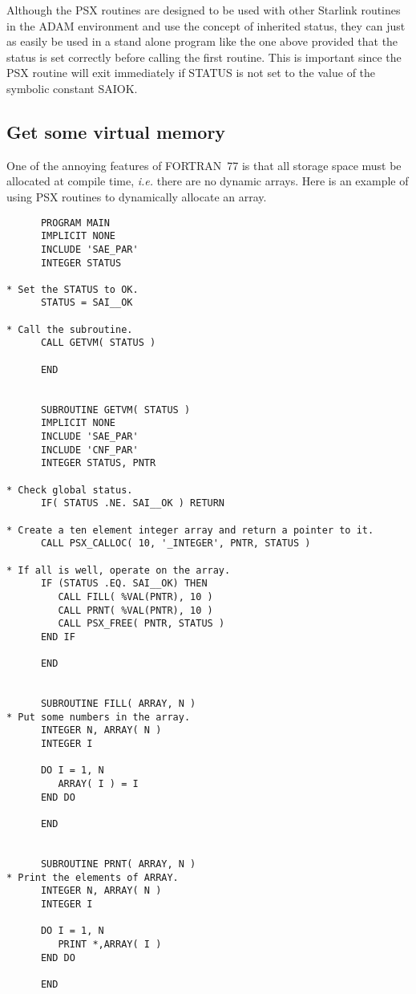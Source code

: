 \documentclass[twoside,11pt]{article}
\newcommand{\xlabel}[1]{}
\renewcommand{\_}{\texttt{\symbol{95}}}
\begin{document}
Although the PSX routines are designed to be used with other Starlink routines
in the ADAM environment and use the concept of inherited status, they can just
as easily be used in a stand alone program like the one above provided that the
status is set correctly before calling the first routine. This is important
since the PSX routine will exit immediately if STATUS is not set to the value
of the symbolic constant SAI\_\_OK.

\subsection{\xlabel{get_some_virtual_memory}Get some virtual memory}

One of the annoying features of FORTRAN~77 is that all storage space must be
allocated at compile time, \emph{i.e.} there are no dynamic arrays. Here is an
example of using PSX routines to dynamically allocate an array.

\begin{small}
\begin{verbatim}
      PROGRAM MAIN
      IMPLICIT NONE
      INCLUDE 'SAE_PAR'
      INTEGER STATUS

* Set the STATUS to OK.
      STATUS = SAI__OK

* Call the subroutine.
      CALL GETVM( STATUS )

      END


      SUBROUTINE GETVM( STATUS )
      IMPLICIT NONE
      INCLUDE 'SAE_PAR'
      INCLUDE 'CNF_PAR'
      INTEGER STATUS, PNTR

* Check global status.
      IF( STATUS .NE. SAI__OK ) RETURN

* Create a ten element integer array and return a pointer to it.
      CALL PSX_CALLOC( 10, '_INTEGER', PNTR, STATUS )

* If all is well, operate on the array.
      IF (STATUS .EQ. SAI__OK) THEN
         CALL FILL( %VAL(PNTR), 10 )
         CALL PRNT( %VAL(PNTR), 10 )
         CALL PSX_FREE( PNTR, STATUS )
      END IF

      END


      SUBROUTINE FILL( ARRAY, N )
* Put some numbers in the array.
      INTEGER N, ARRAY( N )
      INTEGER I

      DO I = 1, N
         ARRAY( I ) = I
      END DO

      END


      SUBROUTINE PRNT( ARRAY, N )
* Print the elements of ARRAY.
      INTEGER N, ARRAY( N )
      INTEGER I

      DO I = 1, N
         PRINT *,ARRAY( I )
      END DO

      END
\end{verbatim}
\end{small}
\end{document}

